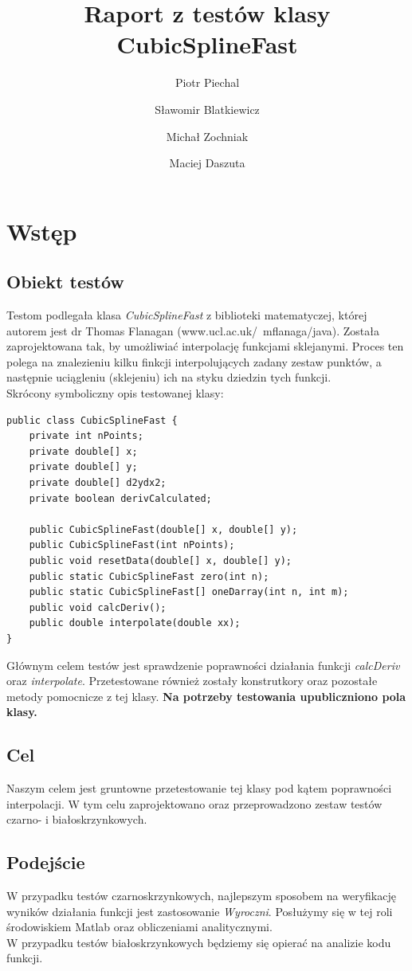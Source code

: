 \documentclass[12pt,a4paper,notitlepage]{article}
\title{Raport z testów klasy CubicSplineFast}
\author{Piotr Piechal \and
Sławomir Blatkiewicz \and
Michał Zochniak \and
Maciej Daszuta}
\begin{document}
\maketitle

\clearpage

\setcounter{tocdepth}{2}
\tableofcontents

\clearpage

\section{Wstęp}
\subsection{Obiekt testów}
Testom podlegała klasa \emph{CubicSplineFast} z biblioteki matematyczej, której autorem jest dr Thomas Flanagan (www.ucl.ac.uk/~mflanaga/java). Została zaprojektowana tak, by umożliwiać interpolację funkcjami sklejanymi. Proces ten polega na znalezieniu kilku finkcji interpolujących zadany zestaw punktów, a następnie uciągleniu (sklejeniu) ich na styku dziedzin tych funkcji.\\
Skrócony symboliczny opis testowanej klasy:
\begin{verbatim}
public class CubicSplineFast {
	private int nPoints;
	private double[] x;
	private double[] y;
	private double[] d2ydx2;
	private boolean derivCalculated;
	
	public CubicSplineFast(double[] x, double[] y);
	public CubicSplineFast(int nPoints);
	public void resetData(double[] x, double[] y);
	public static CubicSplineFast zero(int n);
	public static CubicSplineFast[] oneDarray(int n, int m);
	public void calcDeriv();
	public double interpolate(double xx);
}
\end{verbatim}
Głównym celem testów jest sprawdzenie poprawności działania funkcji \emph{calcDeriv} oraz \emph{interpolate}. Przetestowane również zostały konstrutkory oraz pozostałe metody pomocnicze z tej klasy.
\textbf{Na potrzeby testowania upubliczniono pola klasy.}

\subsection{Cel}
Naszym celem jest gruntowne przetestowanie tej klasy pod kątem poprawności interpolacji. W tym celu zaprojektowano oraz przeprowadzono zestaw testów czarno- i białoskrzynkowych.

\subsection{Podejście}
W przypadku testów czarnoskrzynkowych, najlepszym sposobem na weryfikację wyników działania funkcji jest zastosowanie \emph{Wyroczni}. Posłużymy się w tej roli środowiskiem Matlab oraz obliczeniami analitycznymi.\\
W przypadku testów białoskrzynkowych będziemy się opierać na analizie kodu funkcji.
\end{document}
